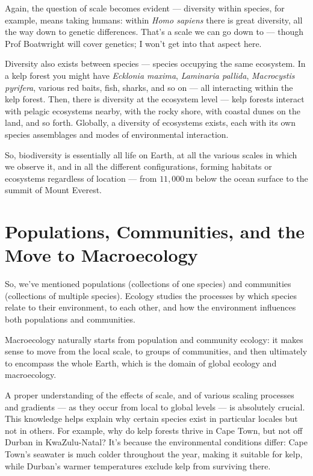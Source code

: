 \documentclass[
  11pt,
]{book}
\begin{document}
Again, the question of scale becomes evident --- diversity within
species, for example, means taking humans: within \emph{Homo sapiens}
there is great diversity, all the way down to genetic differences.
That's a scale we can go down to --- though Prof Boatwright will cover
genetics; I won't get into that aspect here.

Diversity also exists between species --- species occupying the same
ecosystem. In a kelp forest you might have \emph{Ecklonia maxima},
\emph{Laminaria pallida}, \emph{Macrocystis pyrifera}, various red
baits, fish, sharks, and so on --- all interacting within the kelp
forest. Then, there is diversity at the ecosystem level --- kelp forests
interact with pelagic ecosystems nearby, with the rocky shore, with
coastal dunes on the land, and so forth. Globally, a diversity of
ecosystems exists, each with its own species assemblages and modes of
environmental interaction.

So, biodiversity is essentially all life on Earth, at all the various
scales in which we observe it, and in all the different configurations,
forming habitats or ecosystems regardless of location --- from
\(11,000\,\mathrm{m}\) below the ocean surface to the summit of Mount
Everest.

\section{Populations, Communities, and the Move to
Macroecology}\label{populations-communities-and-the-move-to-macroecology}

So, we've mentioned populations (collections of one species) and
communities (collections of multiple species). Ecology studies the
processes by which species relate to their environment, to each other,
and how the environment influences both populations and communities.

Macroecology naturally starts from population and community ecology: it
makes sense to move from the local scale, to groups of communities, and
then ultimately to encompass the whole Earth, which is the domain of
global ecology and macroecology.

A proper understanding of the effects of scale, and of various scaling
processes and gradients --- as they occur from local to global levels
--- is absolutely crucial. This knowledge helps explain why certain
species exist in particular locales but not in others. For example, why
do kelp forests thrive in Cape Town, but not off Durban in
KwaZulu-Natal? It's because the environmental conditions differ: Cape
Town's seawater is much colder throughout the year, making it suitable
for kelp, while Durban's warmer temperatures exclude kelp from surviving
there.
\end{document}
